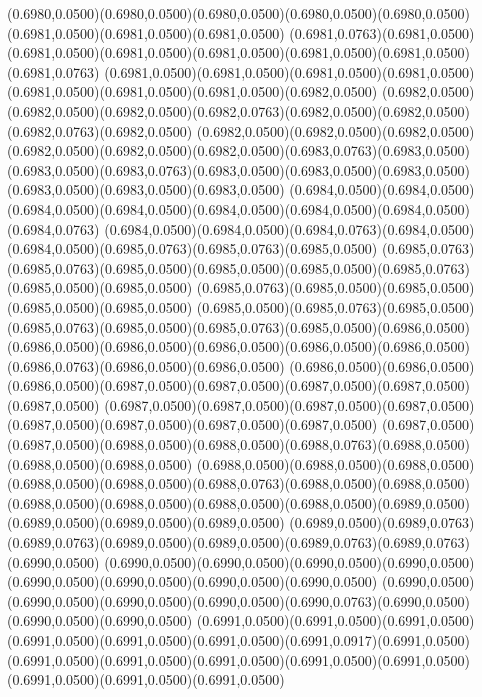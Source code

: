 (0.6980,0.0500)(0.6980,0.0500)(0.6980,0.0500)(0.6980,0.0500)(0.6980,0.0500)(0.6981,0.0500)(0.6981,0.0500)(0.6981,0.0500)
(0.6981,0.0763)(0.6981,0.0500)(0.6981,0.0500)(0.6981,0.0500)(0.6981,0.0500)(0.6981,0.0500)(0.6981,0.0500)(0.6981,0.0763)
(0.6981,0.0500)(0.6981,0.0500)(0.6981,0.0500)(0.6981,0.0500)(0.6981,0.0500)(0.6981,0.0500)(0.6981,0.0500)(0.6982,0.0500)
(0.6982,0.0500)(0.6982,0.0500)(0.6982,0.0500)(0.6982,0.0763)(0.6982,0.0500)(0.6982,0.0500)(0.6982,0.0763)(0.6982,0.0500)
(0.6982,0.0500)(0.6982,0.0500)(0.6982,0.0500)(0.6982,0.0500)(0.6982,0.0500)(0.6982,0.0500)(0.6983,0.0763)(0.6983,0.0500)
(0.6983,0.0500)(0.6983,0.0763)(0.6983,0.0500)(0.6983,0.0500)(0.6983,0.0500)(0.6983,0.0500)(0.6983,0.0500)(0.6983,0.0500)
(0.6984,0.0500)(0.6984,0.0500)(0.6984,0.0500)(0.6984,0.0500)(0.6984,0.0500)(0.6984,0.0500)(0.6984,0.0500)(0.6984,0.0763)
(0.6984,0.0500)(0.6984,0.0500)(0.6984,0.0763)(0.6984,0.0500)(0.6984,0.0500)(0.6985,0.0763)(0.6985,0.0763)(0.6985,0.0500)
(0.6985,0.0763)(0.6985,0.0763)(0.6985,0.0500)(0.6985,0.0500)(0.6985,0.0500)(0.6985,0.0763)(0.6985,0.0500)(0.6985,0.0500)
(0.6985,0.0763)(0.6985,0.0500)(0.6985,0.0500)(0.6985,0.0500)(0.6985,0.0500)
\PST@Solid(0.6985,0.0500)(0.6985,0.0763)(0.6985,0.0500)(0.6985,0.0763)(0.6985,0.0500)(0.6985,0.0763)(0.6985,0.0500)(0.6986,0.0500)
(0.6986,0.0500)(0.6986,0.0500)(0.6986,0.0500)(0.6986,0.0500)(0.6986,0.0500)(0.6986,0.0763)(0.6986,0.0500)(0.6986,0.0500)
(0.6986,0.0500)(0.6986,0.0500)(0.6986,0.0500)(0.6987,0.0500)(0.6987,0.0500)(0.6987,0.0500)(0.6987,0.0500)(0.6987,0.0500)
(0.6987,0.0500)(0.6987,0.0500)(0.6987,0.0500)(0.6987,0.0500)(0.6987,0.0500)(0.6987,0.0500)(0.6987,0.0500)(0.6987,0.0500)
(0.6987,0.0500)(0.6987,0.0500)(0.6988,0.0500)(0.6988,0.0500)(0.6988,0.0763)(0.6988,0.0500)(0.6988,0.0500)(0.6988,0.0500)
(0.6988,0.0500)(0.6988,0.0500)(0.6988,0.0500)(0.6988,0.0500)(0.6988,0.0500)(0.6988,0.0763)(0.6988,0.0500)(0.6988,0.0500)
(0.6988,0.0500)(0.6988,0.0500)(0.6988,0.0500)(0.6988,0.0500)(0.6989,0.0500)(0.6989,0.0500)(0.6989,0.0500)(0.6989,0.0500)
(0.6989,0.0500)(0.6989,0.0763)(0.6989,0.0763)(0.6989,0.0500)(0.6989,0.0500)(0.6989,0.0763)(0.6989,0.0763)(0.6990,0.0500)
(0.6990,0.0500)(0.6990,0.0500)(0.6990,0.0500)(0.6990,0.0500)(0.6990,0.0500)(0.6990,0.0500)(0.6990,0.0500)(0.6990,0.0500)
(0.6990,0.0500)(0.6990,0.0500)(0.6990,0.0500)(0.6990,0.0500)(0.6990,0.0763)(0.6990,0.0500)(0.6990,0.0500)(0.6990,0.0500)
(0.6991,0.0500)(0.6991,0.0500)(0.6991,0.0500)(0.6991,0.0500)(0.6991,0.0500)(0.6991,0.0500)(0.6991,0.0917)(0.6991,0.0500)
(0.6991,0.0500)(0.6991,0.0500)(0.6991,0.0500)(0.6991,0.0500)(0.6991,0.0500)(0.6991,0.0500)(0.6991,0.0500)(0.6991,0.0500)
